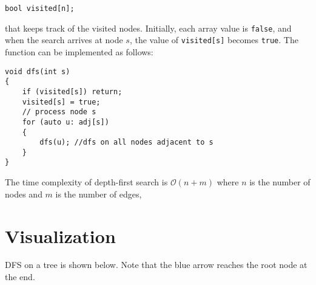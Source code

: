 \documentclass[twoside,12pt,a4paper,english]{book}
\theoremstyle{definition}
\theoremstyle{problemstyle}
\theoremstyle{problemstyle}
\theoremstyle{problemstyle}
\begin{document}
\begin{lstlisting}
bool visited[n];
\end{lstlisting}

that keeps track of the visited nodes. Initially, each array value is \texttt{false}, and
when the search arrives at node $s$, the value of \texttt{visited[s]} becomes \texttt{true}. The function can be implemented as follows:
\newpage

\begin{lstlisting}
void dfs(int s) 
{
    if (visited[s]) return;
    visited[s] = true;
    // process node s
    for (auto u: adj[s]) 
    {
        dfs(u); //dfs on all nodes adjacent to s
    }
}
\end{lstlisting}

The time complexity of depth-first search is $\mathcal{O}(n+m)$
where $n$ is the number of nodes and $m$ is the
number of edges,

\section{Visualization}

DFS on a tree is shown below. Note that the blue arrow reaches the root node at the end.
\end{document}
